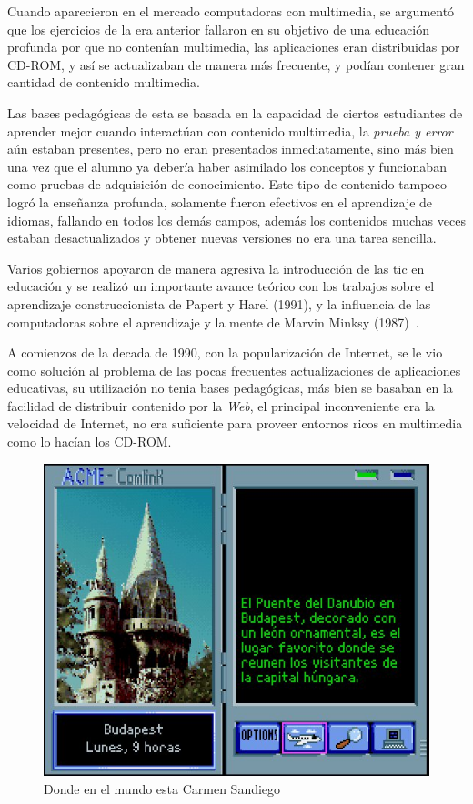 Cuando aparecieron en el mercado computadoras con multimedia, se argumentó que
los ejercicios de la era anterior fallaron en su objetivo de una educación
profunda por que no contenían multimedia\cite{leinonen:ict}, las aplicaciones
eran distribuidas por CD-ROM, y así se actualizaban de manera más frecuente, y
podían contener gran cantidad de contenido multimedia.

Las bases pedagógicas de esta se basada en la capacidad de ciertos estudiantes
de aprender mejor cuando interactúan con contenido multimedia, la \emph{prueba y
	error} aún estaban presentes, pero no eran presentados inmediatamente,
sino más bien una vez que el alumno ya debería haber asimilado los conceptos y
funcionaban como pruebas de adquisición de conocimiento. Este tipo de contenido
tampoco logró la enseñanza profunda, solamente fueron efectivos en el
aprendizaje de idiomas, fallando en todos los demás campos\cite{leinonen:ict},
además los contenidos muchas veces estaban desactualizados y obtener nuevas
versiones no era una tarea sencilla.

Varios gobiernos apoyaron de manera agresiva la introducción de las \Gls{tic} en
educación\cite{mcdougall2006theory} y se realizó un importante avance teórico
con los trabajos sobre el aprendizaje construccionista de Papert y Harel (1991),
y la influencia de las computadoras sobre el aprendizaje y la mente de Marvin
Minksy (1987)~\cite{mcdougall2006theory}.

A comienzos de la decada de 1990, con la popularización de Internet, se le vio
como solución al problema de las pocas frecuentes actualizaciones de aplicaciones
educativas, su utilización no tenia bases pedagógicas, más bien se basaban en la
facilidad de distribuir contenido por la \emph{Web}, el principal inconveniente
era la velocidad de Internet, no era suficiente para proveer entornos ricos en
multimedia como lo hacían los CD-ROM\cite{leinonen:ict}.

\begin{figure}[ht!] 
	\centering 
	\includegraphics[scale=0.5]{tics/carmen.jpg}
	\caption{Donde en el mundo esta Carmen Sandiego} 
	\label{fig:carmen}
\end{figure}

